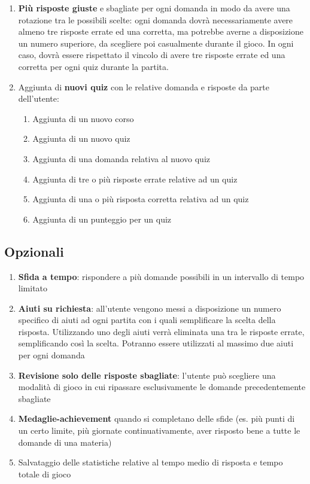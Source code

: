 \begin{enumerate}
            \item \textbf{Più risposte giuste} e sbagliate per ogni domanda in modo da avere una rotazione tra le possibili scelte: ogni domanda dovrà necessariamente avere almeno tre risposte errate ed una corretta, ma potrebbe averne a disposizione un numero superiore, da scegliere poi casualmente durante il gioco. In ogni caso, dovrà essere rispettato il vincolo di avere tre risposte errate ed una corretta per ogni quiz durante la partita.
            
            \item Aggiunta di \textbf{nuovi quiz} con le relative domanda e risposte da parte dell’utente:
                \begin{enumerate}
                        \item Aggiunta di un nuovo corso
                        \item Aggiunta di un nuovo quiz
                        \item Aggiunta di una domanda relativa al nuovo quiz
                        \item Aggiunta di tre o più risposte errate relative ad un quiz
                        \item Aggiunta di una o più risposta corretta relativa ad un quiz
                        \item Aggiunta di un punteggio per un quiz
                    \end{enumerate}
        \end{enumerate}  

    
        \subsection{Opzionali} \label{chap:req_non_funzionali}
        \begin{enumerate}
            \item \textbf{Sfida a tempo}: rispondere a più domande possibili in un intervallo di tempo limitato
            \item \textbf{Aiuti su richiesta}: all’utente vengono messi a disposizione un numero specifico di aiuti ad ogni partita con i quali semplificare la scelta della risposta. Utilizzando uno degli aiuti verrà eliminata una tra le risposte errate, semplificando così la scelta. Potranno essere utilizzati al massimo due aiuti per ogni domanda
            
            \item \textbf{Revisione solo delle risposte sbagliate}: l’utente può scegliere una modalità di gioco in cui ripassare esclusivamente le domande precedentemente sbagliate
            
            \item \textbf{Medaglie-achievement} quando si completano delle sfide (es. più punti di un certo limite, più giornate continuativamente, aver risposto bene a tutte le domande di una materia)
            
            \item Salvataggio delle statistiche relative al tempo medio di risposta e tempo totale di gioco
        \end{enumerate}
        
